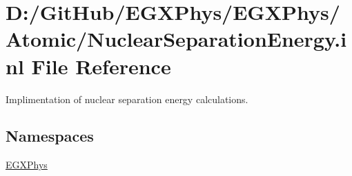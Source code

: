 \hypertarget{_nuclear_separation_energy_8inl}{}\section{D\+:/\+Git\+Hub/\+E\+G\+X\+Phys/\+E\+G\+X\+Phys/\+Atomic/\+Nuclear\+Separation\+Energy.inl File Reference}
\label{_nuclear_separation_energy_8inl}


Implimentation of nuclear separation energy calculations.  


\subsection*{Namespaces}
\begin{DoxyCompactItemize}
\item 
 \mbox{\hyperlink{namespace_e_g_x_phys}{E\+G\+X\+Phys}}
\end{DoxyCompactItemize}
